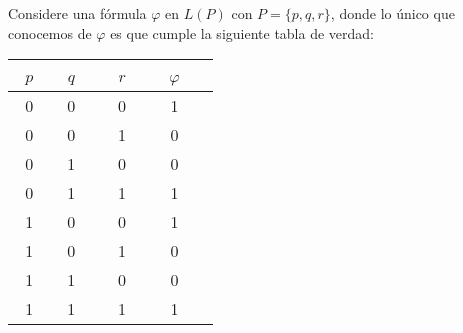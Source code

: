 Considere una f\'ormula $\varphi$ en $L(P)$ con $P=\{p,q,r\}$, donde lo \'unico que conocemos de $\varphi$ es
que cumple la siguiente tabla de verdad:

\begin{center}
\begin{tabular}{ccc|cc} %
~$p$~ & ~$q$~ & ~~$r$~~ & ~$\varphi$~ \\ \hline 
0 & 0 & 0 & 1\\ %
0 & 0 & 1 & 0\\ %
0 & 1 & 0 & 0\\ %
0 & 1 & 1 & 1\\ %
1 & 0 & 0 & 1\\ %
1 & 0 & 1 & 0\\ %
1 & 1 & 0 & 0\\ %
1 & 1 & 1 & 1\\ %
\end{tabular}
\end{center}

